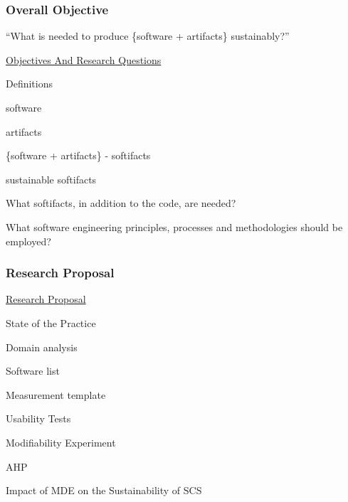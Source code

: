 \documentclass[t,12pt,numbers,fleqn]{beamer}
\begin{document}
\begin{frame}
\frametitle{Overall Objective}

``What is needed to produce \{software + artifacts\} sustainably?''

\href{https://github.com/smiths/AIMSS/blob/master/OverallResearchProposal/ObjectivesAndResearchQuestions.pdf}{Objectives
And Research Questions}

\bi
\item Definitions
\bi
\item software
\item artifacts
\item \{software + artifacts\} - softifacts
\item sustainable softifacts
\ei
\item What softifacts, in addition to the code, are needed?
\item What software engineering principles, processes and methodologies should be employed?
\ei

\end{frame}


\begin{frame}
\frametitle{Research Proposal}

\href{https://github.com/smiths/AIMSS/blob/master/OverallResearchProposal/ResearchProposal.pdf}{Research
Proposal}

\bi
\item State of the Practice
\bi
\item Domain analysis
\item Software list
\item Measurement template
\item Usability Tests
\item Modifiability Experiment
\item AHP
\ei
\item Impact of MDE on the Sustainability of SCS
\ei

\end{frame}

\end{document}
